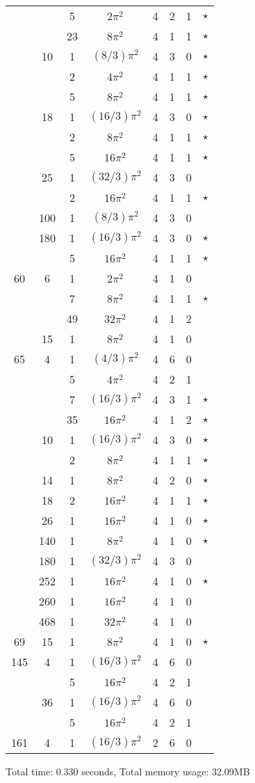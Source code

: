 \begin{tabular}{ccc|ccccc}
 &  & 5 & $2\pi^2$ & 4 & 2 & 1 & $\star$ \\
 &  & 23 & $8\pi^2$ & 4 & 1 & 1 & $\star$ \\
 & 10 & 1 & $(8/3)\pi^2$ & 4 & 3 & 0 & $\star$ \\
 &  & 2 & $4\pi^2$ & 4 & 1 & 1 & $\star$ \\
 &  & 5 & $8\pi^2$ & 4 & 1 & 1 & $\star$ \\
 & 18 & 1 & $(16/3)\pi^2$ & 4 & 3 & 0 & $\star$ \\
 &  & 2 & $8\pi^2$ & 4 & 1 & 1 & $\star$ \\
 &  & 5 & $16\pi^2$ & 4 & 1 & 1 & $\star$ \\
 & 25 & 1 & $(32/3)\pi^2$ & 4 & 3 & 0 &  \\
 &  & 2 & $16\pi^2$ & 4 & 1 & 1 & $\star$ \\
 & 100 & 1 & $(8/3)\pi^2$ & 4 & 3 & 0 &  \\
 & 180 & 1 & $(16/3)\pi^2$ & 4 & 3 & 0 & $\star$ \\
 &  & 5 & $16\pi^2$ & 4 & 1 & 1 & $\star$ \\
60 & 6 & 1 & $2\pi^2$ & 4 & 1 & 0 &  \\
 &  & 7 & $8\pi^2$ & 4 & 1 & 1 & $\star$ \\
 &  & 49 & $32\pi^2$ & 4 & 1 & 2 &  \\
 & 15 & 1 & $8\pi^2$ & 4 & 1 & 0 &  \\
65 & 4 & 1 & $(4/3)\pi^2$ & 4 & 6 & 0 &  \\
 &  & 5 & $4\pi^2$ & 4 & 2 & 1 &  \\
 &  & 7 & $(16/3)\pi^2$ & 4 & 3 & 1 & $\star$ \\
 &  & 35 & $16\pi^2$ & 4 & 1 & 2 & $\star$ \\
 & 10 & 1 & $(16/3)\pi^2$ & 4 & 3 & 0 & $\star$ \\
 &  & 2 & $8\pi^2$ & 4 & 1 & 1 & $\star$ \\
 & 14 & 1 & $8\pi^2$ & 4 & 2 & 0 & $\star$ \\
 & 18 & 2 & $16\pi^2$ & 4 & 1 & 1 & $\star$ \\
 & 26 & 1 & $16\pi^2$ & 4 & 1 & 0 & $\star$ \\
 & 140 & 1 & $8\pi^2$ & 4 & 1 & 0 & $\star$ \\
 & 180 & 1 & $(32/3)\pi^2$ & 4 & 3 & 0 &  \\
 & 252 & 1 & $16\pi^2$ & 4 & 1 & 0 & $\star$ \\
 & 260 & 1 & $16\pi^2$ & 4 & 1 & 0 &  \\
 & 468 & 1 & $32\pi^2$ & 4 & 1 & 0 &  \\
69 & 15 & 1 & $8\pi^2$ & 4 & 1 & 0 & $\star$ \\
145 & 4 & 1 & $(16/3)\pi^2$ & 4 & 6 & 0 &  \\
 &  & 5 & $16\pi^2$ & 4 & 2 & 1 &  \\
 & 36 & 1 & $(16/3)\pi^2$ & 4 & 6 & 0 &  \\
 &  & 5 & $16\pi^2$ & 4 & 2 & 1 &  \\
161 & 4 & 1 & $(16/3)\pi^2$ & 2 & 6 & 0 &  \\
\end{tabular}
Total time: 0.330 seconds, Total memory usage: 32.09MB

